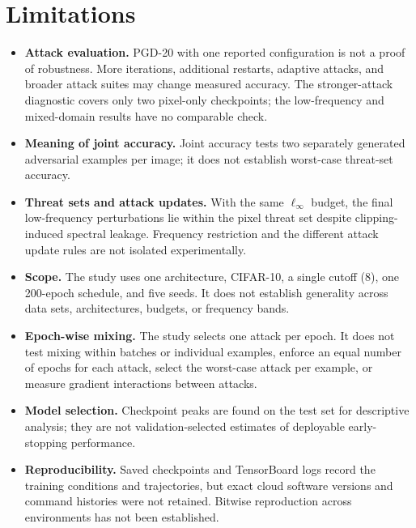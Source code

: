 \documentclass{article}
\newcommand{\linf}{\ell_\infty}
\begin{document}
\section{Limitations}
\label{sec:limitations}
\begin{itemize}
  \item \textbf{Attack evaluation.} PGD-20 with one reported configuration is
  not a proof of robustness. More iterations, additional restarts, adaptive
  attacks, and broader attack suites may change measured accuracy. The
  stronger-attack diagnostic covers only two pixel-only checkpoints; the
  low-frequency and mixed-domain results have no comparable check.
  \item \textbf{Meaning of joint accuracy.} Joint accuracy tests two separately
  generated adversarial examples per image; it does not establish worst-case
  threat-set accuracy.
  \item \textbf{Threat sets and attack updates.} With the same $\linf$ budget, the
  final low-frequency perturbations lie within the pixel threat set despite
  clipping-induced spectral leakage. Frequency restriction and the different
  attack update rules are not isolated experimentally.
  \item \textbf{Scope.} The study uses one architecture, CIFAR-10, a single
  cutoff ($8$), one 200-epoch schedule, and five seeds. It does not establish
  generality across data sets, architectures, budgets, or frequency bands.
  \item \textbf{Epoch-wise mixing.} The study selects one attack per epoch.
  It does not test mixing within batches or individual examples, enforce an
  equal number of epochs for each attack, select the worst-case attack per
  example, or measure gradient interactions between attacks.
  \item \textbf{Model selection.} Checkpoint peaks are found on the test set
  for descriptive analysis; they are not validation-selected estimates of
  deployable early-stopping performance.
  \item \textbf{Reproducibility.} Saved checkpoints and TensorBoard logs
  record the training conditions and trajectories, but exact cloud software
  versions and command histories were not retained. Bitwise reproduction
  across environments has not been established.
\end{itemize}
\end{document}
